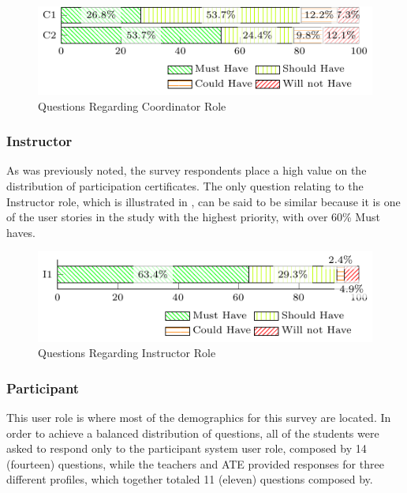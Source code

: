 \begin{figure}[!htb]
  \caption{Questions Regarding Coordinator Role}\label{fig:coordinator-questions}
  \begin{center}
    \includegraphics[width=.7\textwidth]{img/5-questions-coordinator.pdf}
  \end{center}
\end{figure}

\subsubsection{Instructor} \label{sec:survey-quant-instructor}
As was previously noted, the survey respondents place a high value on the distribution of participation certificates. The only question relating to the Instructor role, which is illustrated in , can be said to be similar because it is one of the user stories in the study with the highest priority, with over 60\% Must haves.

\begin{figure}[!htb]
  \caption{Questions Regarding Instructor Role}\label{fig:instructor-questions}
  \begin{center}
    \includegraphics[width=.7\textwidth]{img/5-questions-instructor.pdf}
  \end{center}
\end{figure}

\subsubsection{Participant} \label{sec:survey-quant-participant}

This user role is where most of the demographics for this survey are located. In order to achieve a balanced distribution of questions, all of the students were asked to respond only to the participant system user role, composed by 14 (fourteen) questions, while the teachers and \ac{ATE} provided responses for three different profiles, which together totaled 11 (eleven) questions composed by. 

